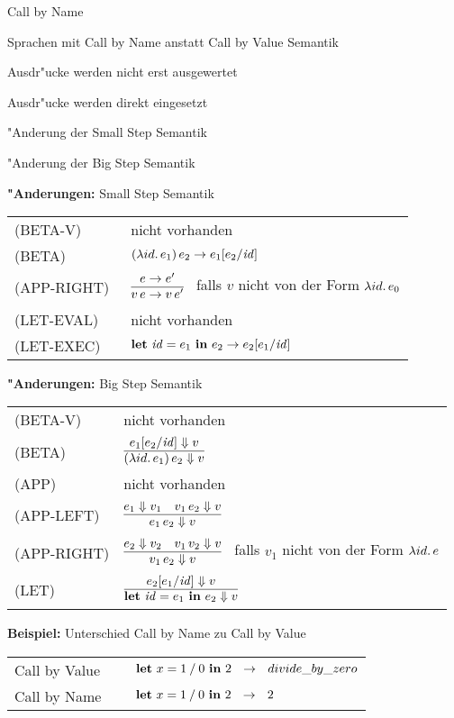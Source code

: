 {
  \begin{itemgroup}{Call by Name}
    \item Sprachen mit Call by Name anstatt Call by Value Semantik
    \item Ausdr"ucke werden nicht erst ausgewertet
    \item Ausdr"ucke werden direkt eingesetzt
    \item "Anderung der Small Step Semantik
    \item "Anderung der Big Step Semantik
  \end{itemgroup}
}


{
  {\bf "Anderungen:} Small Step Semantik\\[5mm]
  \begin{tabular}{ll}
     \mbox{(BETA-V)}      & nicht vorhanden \\[3mm]
     \mbox{(BETA)}        & $(\lambda id.\,e_1)\,e_2 \to e_1[e_2/{\text{\it id\/}}]$ \\[3mm]
     \mbox{(APP-RIGHT)\ } & $\regel{e \to e'}
                                   {v\,e \to v\,e'}$ \ 
                                   falls ${v}$ nicht von der Form $\lambda id.\,e_0$ \\[5mm]
     \mbox{(LET-EVAL)\  } & nicht vorhanden \\[3mm]
     \mbox{(LET-EXEC)}    & $\textbf{let}\ {\text{\it id\/}} = e_1\ \textbf{in}\ e_2 \to e_2[e_1/{\text{\it id\/}}]$ \\[3mm]
  \end{tabular}
}


{
  {\bf "Anderungen:} Big Step Semantik\\[5mm]
  \begin{tabular}{ll}
     \mbox{(BETA-V)}      & nicht vorhanden \\[3mm]
     \mbox{(BETA)}        & $\regel{e_1[e_2/\id] \eval v}
                                   {(\abstr{id}{e_1})\,e_2 \eval v}$ \\[5mm]
     \mbox{(APP)}         & nicht vorhanden \\[3mm]
     \mbox{(APP-LEFT)}    & $\regel{e_1 \eval v_1 \quad v_1\,e_2 \eval v}
                                   {e_1\,e_2 \eval v}$ \\[5mm]
     \mbox{(APP-RIGHT)}   & $\regel{e_2 \eval v_2 \quad v_1\,v_2 \eval v}
                                   {v_1\,e_2 \eval v}$ \ 
                                   falls ${v_1}$ nicht von der Form $\lambda id.\,e$ \\[5mm]
     \mbox{(LET)}         & $\regel{e_2[e_1/\id] \eval v}
                                   {\bli{\id}{e_1}{e_2} \eval v}$ \\[5mm]
  \end{tabular}
}


{
  {\bf Beispiel:} Unterschied Call by Name zu Call by Value\\[5mm]
  \begin{tabular}{ll}
     Call by Value $\quad$      & $\bli{x}{\infix{/}{1}{0}}{2} \ \ \to \ \ divide\_by\_zero$ \\[3mm]
     Call by Name $\quad$       & $\bli{x}{\infix{/}{1}{0}}{2} \ \ \to \ \ 2$ \\[3mm]
  \end{tabular}
}